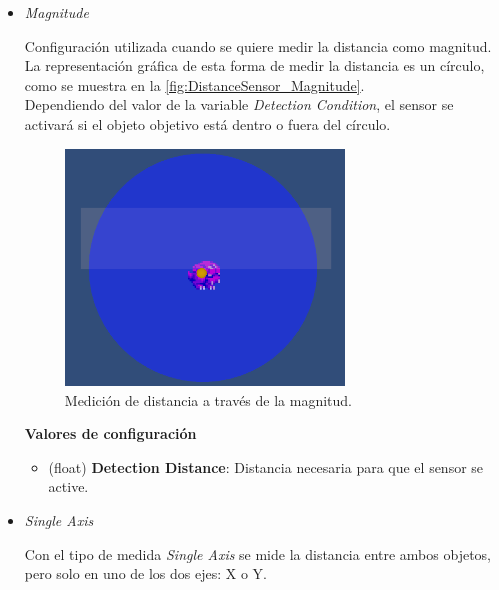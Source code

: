 \begin{itemize}
	\item \textit{Magnitude}

Configuración utilizada cuando se quiere medir la distancia como magnitud. La representación gráfica de esta forma de medir la distancia es un círculo, como se muestra en la \autoref{fig:DistanceSensor_Magnitude}.\\
Dependiendo del valor de la variable \textit{Detection Condition}, el sensor se activará si el objeto objetivo está dentro o fuera del círculo.
	\begin{figure}[t]
		\centering
		\includegraphics[width = 0.7\textwidth]{Imagenes/DistanceSensorMagnitude.png}
		\caption{Medición de distancia a través de la magnitud.}
		\label{fig:DistanceSensor_Magnitude}
	\end{figure}

\textbf{Valores de configuración}
	\begin{itemize}
	        \item (float) \textbf{Detection Distance}: Distancia necesaria para que el sensor se active.
	 \end{itemize}

	\item \textit{Single Axis}

Con el tipo de medida \textit{Single Axis} se mide la distancia entre ambos objetos, pero solo en uno de los dos ejes: X o Y.\\


\end{itemize}
